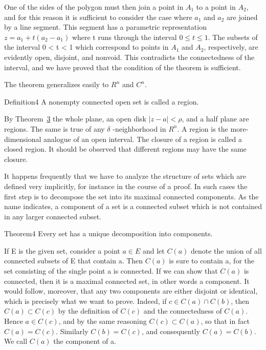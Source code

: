 One of the sides of the polygon must then join a point in $A_{1}$ to a point in $A_{2}$, and for this reason it is sufficient to consider the case where $a_{1}$ and $a_{2}$ are joined by a line segment. This segment has a parametric representation $z = a_{1} + t(a_{2} - a_{1})$ where t runs through the interval $0 \leq t \leq 1$. The subsets of the interval 0 < t < 1 which correspond to points in $A_{1}$ and $A_{2}$, respectively, are evidently open, disjoint, and nonvoid. This contradicts the connectedness of the interval, and we have proved that the condition of the theorem is sufficient.

The theorem generalizes easily to $R^{n}$ and $C^{n}$.

\begin{originalstatement}{Definition}{4}\label{def:3.4}
A nonempty connected open set is called a region.
\end{originalstatement}
By Theorem~\hyperref[thm:3.3]{3} the whole plane, an open disk $|z - a| < \rho$, and a half plane are regions. The same is true of any $\delta$ -neighborhood in $R^{n}$. A region is the more-dimensional analogue of an open interval. The closure of a region is called a closed region. It should be observed that different regions may have the same closure.

It happens frequently that we have to analyze the structure of sets which are defined very implicitly, for instance in the course of a proof. In such cases the first step is to decompose the set into its maximal connected components. As the name indicates, a component of a set is a connected subset which is not contained in any larger connected subset.

\begin{originalstatement}{Theorem}{4}\label{thm:3.4}
Every set has a unique decomposition into components.
\end{originalstatement}
If E is the given set, consider a point $a \in E$ and let $C(a)$ denote the union of all connected subsets of E that contain a. Then $C(a)$ is sure to contain a, for the set consisting of the single point a is connected. If we can show that $C(a)$ is connected, then it is a maximal connected set, in other words a component. It would follow, moreover, that any two components are either disjoint or identical, which is precisely what we want to prove. Indeed, if $c \in C(a) \cap C(b)$, then $C(a) \subset C(c)$ by the definition of $C(c)$ and the connectedness of $C(a)$. Hence $a \in C(c)$, and by the same reasoning $C(c) \subset C(a)$, so that in fact $C(a) = C(c)$. Similarly $C(b) = C(c)$, and consequently $C(a) = C(b)$. We call $C(a)$ the component of a.

